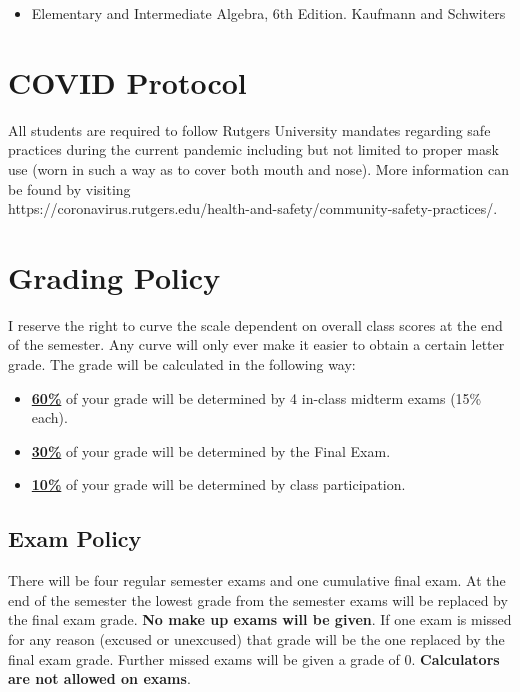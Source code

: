 \documentclass[11pt]{article}
\begin{document}
\begin{itemize}
\item Elementary and Intermediate Algebra, 6th Edition. Kaufmann and Schwiters
\end{itemize}


\section*{COVID Protocol}
All students are required to follow Rutgers University mandates regarding
safe practices during the current pandemic including but not limited to proper mask use (worn
in such a way as to cover both mouth and nose). More information can be found by visiting \\
https://coronavirus.rutgers.edu/health-and-safety/community-safety-practices/. 

\newpage

\section*{Grading Policy}
I reserve the right to curve the scale dependent on overall class scores at the end of the semester. Any curve will only ever make it easier to obtain a certain letter grade. The grade will be calculated in the following way:
\begin{itemize}
	\item \underline{\textbf{60\%}} of your grade will be determined by 4 in-class midterm exams (15\% each).
	\item \underline{\textbf{30\%}} of your grade will be determined by the Final Exam.
	\item \underline{\textbf{10\%}} of your grade will be determined by class participation.
\end{itemize}

\subsection*{Exam Policy}
There will be four regular semester exams and one cumulative final exam. At the
end of the semester the lowest grade from the semester exams will be replaced by the final exam
grade. \textbf{No make up exams will be given}. If one exam is missed for any reason (excused or
unexcused) that grade will be the one replaced by the final exam grade. Further missed exams will
be given a grade of 0. \textbf{Calculators are not allowed on exams}.
\end{document}
